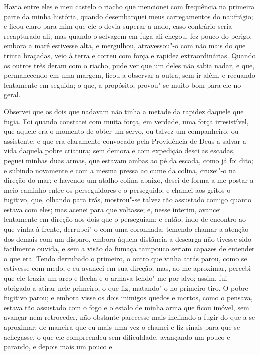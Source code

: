 Havia entre eles e meu castelo o riacho que mencionei com frequência na
primeira parte da minha história, quando desembarquei meus carregamentos
do naufrágio; e ficou claro para mim que ele o devia superar a nado,
caso contrário seria recapturado ali; mas quando o selvagem em fuga ali
chegou, fez pouco do perigo, embora a maré estivesse alta, e mergulhou,
atravessou"-o com não mais do que trinta braçadas, veio à terra e correu
com força e rapidez extraordinárias. Quando os outros três deram com o
riacho, pude ver que um deles não sabia nadar, e que, permanecendo em
uma margem, ficou a observar a outra, sem ir além, e recuando lentamente
em seguida; o que, a propósito, provou"-se muito bom para ele no geral.

Observei que os dois que nadavam não tinha a metade da rapidez daquele
que fugia. Foi quando constatei com muita força, em verdade, uma força
irresistível, que aquele era o momento de obter um servo, ou talvez um
companheiro, ou assistente; e que era claramente convocado pela
Providência de Deus a salvar a vida daquela pobre criatura; sem demora e
com expedição desci as escadas, peguei minhas duas armas, que estavam
ambas ao pé da escada, como já foi dito; e subindo novamente e com a
mesma pressa ao cume da colina, cruzei"-o na direção do mar; e havendo um
atalho colina abaixo, desci de forma a me postar a meio caminho entre os
perseguidores e o perseguido; e chamei aos gritos o fugitivo, que,
olhando para trás, mostrou"-se talvez tão assustado comigo quanto estava
com eles; mas acenei para que voltasse; e, nesse ínterim, avancei
lentamente em direção aos dois que o perseguiam; e então, indo de
encontro ao que vinha à frente, derrubei"-o com uma coronhada; temendo
chamar a atenção dos demais com um disparo, embora àquela distância a
descarga não tivesse sido facilmente ouvida, e sem a visão da fumaça
tampouco seriam capazes de entender o que era. Tendo derrubado o
primeiro, o outro que vinha atrás parou, como se estivesse com medo, e
eu avancei em sua direção; mas, ao me aproximar, percebi que ele trazia
um arco e flecha e o armava tendo"-me por alvo; assim, fui obrigado a
atirar nele primeiro, o que fiz, matando"-o no primeiro tiro. O pobre
fugitivo parou; e embora visse os dois inimigos quedos e mortos, como o
pensava, estava tão assustado com o fogo e o estalo de minha arma que
ficou imóvel, sem avançar nem retroceder, não obstante parecesse mais
inclinado a fugir do que a se aproximar; de maneira que eu mais uma vez
o chamei e fiz sinais para que se achegasse, o que ele compreendeu sem
dificuldade, avançando um pouco e parando, e depois mais um pouco e
